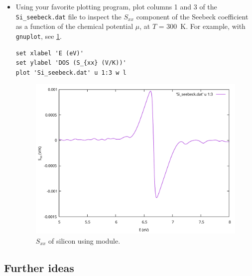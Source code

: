 \documentclass[11pt,a4paper]{article}
\begin{document}
\begin{itemize}
\item Using your favorite plotting program, plot columns 1 and 3 of the
\texttt{Si\_seebeck.dat} file to inspect the $S_{xx}$ component of the Seebeck
coefficient as a function of the chemical potential $\mu$, at $T$ =
\SI{300}{K}. For example, with \texttt{gnuplot}, see \cref{fig:seebeck}.
\begin{verbatim}
set xlabel 'E (eV)'
set ylabel 'DOS (S_{xx} (V/K))'
plot 'Si_seebeck.dat' u 1:3 w l
\end{verbatim}
\begin{figure}[htb]
  \centering
  \includegraphics[width=.7\textwidth]{fig/seebeck.pdf}
  \caption{$S_{xx}$ of silicon using \boltzwan module.}
  \label{fig:seebeck}
\end{figure}
\end{itemize}

\subsection{Further ideas}
\end{document}
